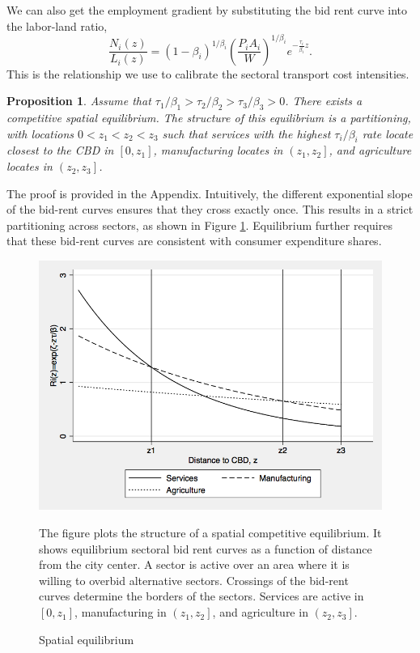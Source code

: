 \documentclass[12pt]{article}
\newtheorem{proposition}{Proposition}
\begin{document}
We can also get the employment gradient by substituting the bid rent curve into the labor-land ratio,
\begin{equation}
\label{eq:EmpGrad}
\frac{N_i(z)}{L_i(z)} = (1-\beta_i)^{1/\beta_i} \left(\frac{P_iA_i}{W}\right)^{1/\beta_i} e^{-\frac{\tau_i}{\beta_i} z}.
\end{equation}
This is the relationship we use to calibrate the sectoral transport cost intensities.

\begin{proposition}\label{prop:existence}
Assume that $\tau_1/\beta_1>\tau_2/\beta_2>\tau_3/\beta_3>0$. There exists a competitive spatial equilibrium. The structure of this equilibrium is a partitioning, with locations $0<z_1<z_2<z_3$ such that services with the highest $\tau_i/\beta_i$ rate locate closest to the CBD in $\left[0,z_1\right]$, manufacturing locates in $\left(z_1,z_2\right]$, and agriculture locates in $\left(z_2,z_3\right]$.
\end{proposition}
The proof is provided in the Appendix. Intuitively, the different exponential slope of the bid-rent curves ensures that they cross exactly once. This results in a strict partitioning across sectors, as shown in Figure \ref{fig:BidRent}. Equilibrium further requires that these bid-rent curves are consistent with consumer expenditure shares.

\begin{figure}[h!]
\caption{Spatial equilibrium\label{fig:BidRent}}
\begin{center}
\includegraphics[scale=0.4]{figures/bid_rent_curves}
\end{center}

\noindent \footnotesize{The figure plots the structure of a spatial competitive equilibrium. It shows equilibrium sectoral bid rent curves as a function of distance from the city center. A sector is active over an area where it is willing to overbid alternative sectors. Crossings of the bid-rent curves determine the borders of the sectors. Services are active in $[0,z_1]$, manufacturing in $\left(z_1,z_2\right]$, and agriculture in $\left(z_2,z_3\right]$.}
\end{figure}
\end{document}
